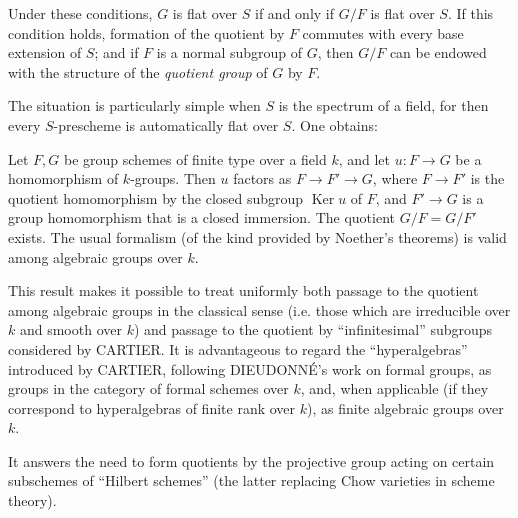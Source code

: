  Under these conditions, $G$ is flat over $S$ if and
only if $G/F$ is flat over $S$. If this condition holds, formation of the
quotient by $F$ commutes with every base extension of $S$; and if $F$ is a
normal subgroup of $G$, then $G/F$ can be endowed with the structure of the
\emph{quotient group} of $G$ by $F$.

The situation is particularly simple when $S$ is the spectrum of a field, for
then every $S$-prescheme is automatically flat over $S$. One obtains:

 Let $F,G$ be group schemes of finite type over a field
$k$, and let $u:F\to G$ be a homomorphism of $k$-groups. Then $u$ factors as
$F\to F'\to G$, where $F\to F'$ is the quotient homomorphism by the closed
subgroup $\operatorname{Ker}u$ of $F$, and $F'\to G$ is a group homomorphism
that is a closed immersion. The quotient $G/F=G/F'$ exists. The usual
formalism (of the kind provided by Noether's theorems) is valid among
algebraic groups over $k$.

This result makes it possible to treat uniformly both passage to the quotient
among algebraic groups in the classical sense (i.e. those which are
irreducible over $k$ and smooth over $k$) and passage to the quotient by
``infinitesimal'' subgroups
considered by CARTIER. It is advantageous to regard the ``hyperalgebras''
introduced by CARTIER, following DIEUDONNÉ's work on formal groups, as groups
in the category of formal schemes over $k$, and, when applicable (if they
correspond to hyperalgebras of finite rank over $k$), as finite algebraic
groups over $k$.


It answers the need to form quotients by the projective group acting on
certain subschemes of ``Hilbert schemes'' (the latter replacing Chow varieties
in scheme theory).

